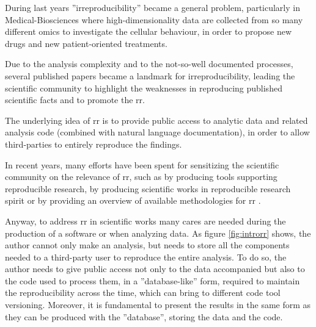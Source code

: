 During last years ''irreproducibility'' became a general problem, particularly in Medical-Biosciences where high-dimensionality data are collected from so many different omics to investigate the cellular behaviour, in order to propose new drugs and new patient-oriented treatments.

Due to the analysis complexity and to the not-so-well documented processes, several published papers \cite{Baggerly2009, Potti2011} became a landmark for irreproducibility, leading the scientific community to highlight the weaknesses in reproducing published scientific facts and to promote the \gls{rr}.

The underlying idea of \gls{rr} \cite{Fomel2009b} is to provide public access to analytic data and related analysis code (combined with natural language documentation), in order to allow third-parties to entirely reproduce the findings.

In recent years, many efforts have been spent for sensitizing the scientific community on the relevance of \gls{rr}, such as by producing tools \cite{RussoRighelli2016} supporting reproducible research, by producing scientific works in reproducible research spirit \cite{CostaRighelli2017} or by providing an overview of available methodologies for \gls{rr} \cite{russo2015advantages}.

Anyway, to address \gls{rr} in scientific works many cares are needed during the production of a software or when analyzing data.
As figure \ref{fig:introrr} \cite{Peng2009} shows, the author cannot only make an analysis, but needs to store all the components needed to a third-party user to reproduce the entire analysis.
To do so, the author needs to give public access not only to the data accompanied but also to the code used to process them, in a ''database-like'' form, required to maintain the reproducibility across the time, which can bring to different code tool versioning.
Moreover, it is fundamental to present the results in the same form as they can be produced with the ''database'', storing the data and the code.

